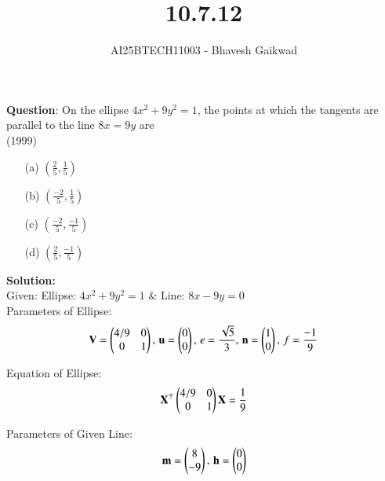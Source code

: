 \documentclass[journal]{IEEEtran}
\begin{document}

\vspace{3cm}

\title{10.7.12}
\author{AI25BTECH11003 - Bhavesh Gaikwad}
{\let\newpage\relax\maketitle}

\renewcommand{\thefigure}{\theenumi}
\renewcommand{\thetable}{\theenumi}
\setlength{\intextsep}{10pt} 

\renewcommand{\thetable}{\theenumi}


\textbf{Question}: On the ellipse $4x^2 + 9y^2 = 1$, the points at which the tangents are parallel to the line $8x = 9y$ are\\

\hfill{(1999)}

\begin{itemize}
    \item[(a)] $(\frac{2}{5}, \frac{1}{5})$
    \item[(b)] $(\frac{-2}{5},\frac{1}{5})$
    \item[(c)] $(\frac{-2}{5},\frac{-1}{5})$
    \item[(d)] $(\frac{2}{5},\frac{-1}{5})$
\end{itemize}

\bigskip
 
\textbf{Solution:}\\
Given: Ellipse: $4x^2 + 9y^2 = 1$ \& Line: $8x-9y=0$\\

Parameters of Ellipse:
\begin{equation}
\mathbf{V} = \begin{pmatrix}4/9 & 0 \\ 0 & 1\end{pmatrix}, \, \mathbf{u} = \begin{pmatrix}0 \\ 0\end{pmatrix}, \, e = \dfrac{\sqrt{5}}{3}, \, \mathbf{n} = \begin{pmatrix}1 \\ 0\end{pmatrix}, \, f = \frac{-1}{9}
\end{equation}

Equation of Ellipse:
\begin{equation}
    \mathbf{X}^\top \begin{pmatrix}4/9 & 0 \\ 0 & 1\end{pmatrix}\mathbf{X} = \frac{1}{9}
\end{equation}

Parameters of Given Line:
\begin{equation}
\mathbf{m} =  \begin{pmatrix}8 \\ -9\end{pmatrix}, \, \mathbf{h}=\begin{pmatrix}0 \\ 0\end{pmatrix}
\end{equation}
\end{document}
